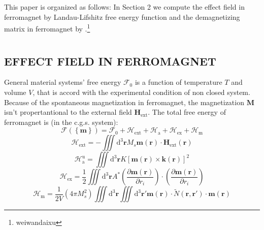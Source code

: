 \documentclass{article}
\begin{document}
This paper is organized as follows: In Section 2 we compute the effect field in ferromagnet by Landau-Lifshitz free energy function and the demagnetizing matrix in ferromagnet by .\footnote{weiwandaixu}
\section{}
\subsection{EFFECT FIELD IN FERROMAGNET}
General material systems' free energy $\mathcal{F}_0$ is a function of temperature $T$ and volume $V$, that is accord with the experimental condition of non closed system. Because of the spontaneous magnetization in ferromagnet, the magnetization $\bm{M}$ isn't propertantional to the external field $\bm{H}_\text{ext}$. The total free energy of ferromagnet is (in the c.g.s. system):
\begin{equation}
\mathcal{F}\left(\left\{\bm{m}\right\}\right)=\mathcal{F}_0+\mathcal{H}_\text{ext}+\mathcal{H}_\text{a}+\mathcal{H}_\text{ex}+\mathcal{H}_\text{m}\label{eq8}
\end{equation}
\begin{equation}
\mathcal{H}_\text{ext}=-\iiint\mathrm{d}^3\bm{r} M_s\bm{m}\left(\bm{r}\right)\cdot \bm{H}_\text{ext}\left(\bm{r}\right)\label{eq9}
\end{equation}
\begin{equation}
\mathcal{H}_\text{a}^\text{u}=\iiint \mathrm{d}^3\bm{r} K\left[\bm{m}\left(\bm{r}\right)\times \bm{k}\left(\bm{r}\right)\right]^2\label{eq10}
\end{equation}
\begin{equation}
\mathcal{H}_\text{ex}=\frac{1}{2}\iiint \mathrm{d}^3 \bm{r} A^*\left(\frac{\partial \bm{m}\left(\bm{r}\right)}{\partial r_i}\right)\cdot \left(\frac{\partial \bm{m}\left(\bm{r}\right)}{\partial r_i}\right)\label{eq11}
\end{equation}
\begin{equation}
\mathcal{H}_\text{m}=\frac{1}{2V}\left(4\pi M_s^2\right)\iiint \mathrm{d}^3\bm{r}\iiint \mathrm{d}^{3}\bm{r}'\bm{m}\left(\bm{r}\right)\cdot\tilde{N}\left(\bm{r},\bm{r}'\right) \cdot\bm{m}\left(\bm{r}\right)\label{eq12}
\end{equation}
\end{document}
